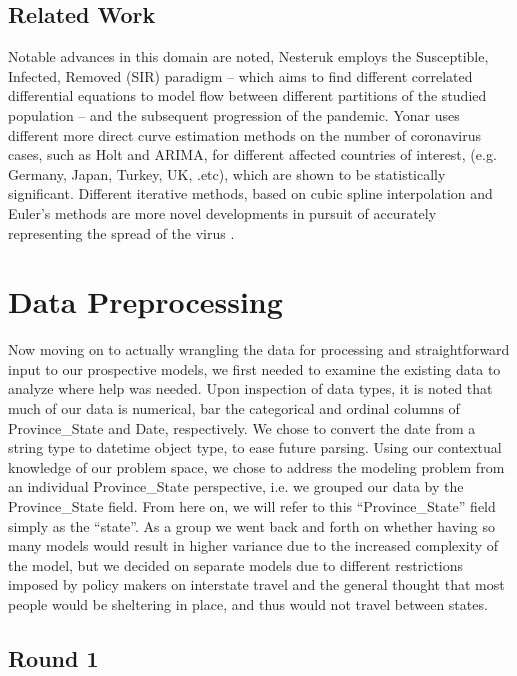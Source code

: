 \documentclass[sigconf,nonacm]{acmart}
\begin{document}
\subsection{Related Work}

Notable advances in this domain are noted, Nesteruk \cite{Nesteruk} employs the
Susceptible, Infected, Removed (SIR) paradigm – which aims to find different
correlated differential equations to model flow between different partitions of
the studied population – and the subsequent progression of the pandemic. Yonar
\cite{EJMO} uses different more direct curve estimation methods on the number
of coronavirus cases, such as Holt and ARIMA, for different affected countries
of interest, (e.g. Germany, Japan, Turkey, UK, .etc), which are shown to be
statistically significant. Different iterative methods, based on cubic spline
interpolation and Euler's methods are more novel developments in pursuit of
accurately representing the spread of the virus \cite{APPADU2020}.

\section{Data Preprocessing}

Now moving on to actually wrangling the data for processing and straightforward
input to our prospective models, we first needed to examine the existing data
to analyze where help was needed. Upon inspection of data types, it is noted
that much of our data is numerical, bar the categorical and ordinal columns of
Province\_State and Date, respectively. We chose to convert the date from a
string type to datetime object type, to ease future parsing. Using our
contextual knowledge of our problem space, we chose to address the modeling
problem from an individual Province\_State perspective, i.e. we grouped our
data by the Province\_State field. From here on, we will refer to this
“Province\_State” field simply as the “state”. As a group we went back and
forth on whether having so many models would result in higher variance due to
the increased complexity of the model, but we decided on separate models due to
different restrictions imposed by policy makers on interstate travel and the
general thought that most people would be sheltering in place, and thus would
not travel between states.

\subsection{Round 1}
\end{document}
